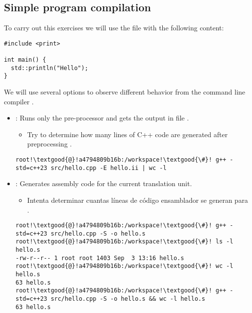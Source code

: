 \subsection{Simple program compilation}

To carry out this exercises we will use the file 
with the following content:

\begin{lstlisting}
#include <print>

int main() {
  std::println("Hello");
}
\end{lstlisting}

We will use several options to observe different behavior from the command line
compiler 
.

\begin{itemize}
  \item {}: 
  Runs only the pre-processor and gets the output in file .
    \begin{itemize}
      \item Try to determine how many lines of C++ code are generated
            after preprocessing .
    \end{itemize}
\begin{lstlisting}[style=terminal,escapechar=!]
root!\textgood{@}!a4794809b16b:/workspace!\textgood{\#}! g++ -std=c++23 src/hello.cpp -E hello.ii | wc -l
\end{lstlisting}


  \item {}:
  Generates assembly code for the current translation unit.
    \begin{itemize}
      \item Intenta determinar cuantas líneas de código ensamblador se generan para .
    \end{itemize}
\begin{lstlisting}[style=terminal,escapechar=!]
root!\textgood{@}!a4794809b16b:/workspace!\textgood{\#}! g++ -std=c++23 src/hello.cpp -S -o hello.s
root!\textgood{@}!a4794809b16b:/workspace!\textgood{\#}! ls -l hello.s
-rw-r--r-- 1 root root 1403 Sep  3 13:16 hello.s
root!\textgood{@}!a4794809b16b:/workspace!\textgood{\#}! wc -l hello.s 
63 hello.s
root!\textgood{@}!a4794809b16b:/workspace!\textgood{\#}! g++ -std=c++23 src/hello.cpp -S -o hello.s && wc -l hello.s 
63 hello.s
\end{lstlisting}


\end{itemize}
